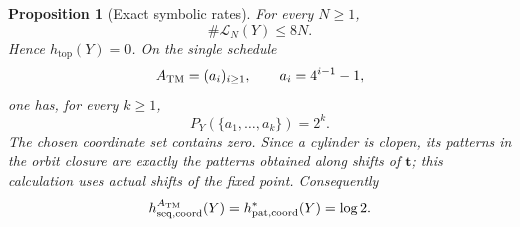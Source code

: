 \documentclass[11pt,reqno]{amsart}
\numberwithin{equation}{section}
\newtheorem{proposition}[theorem]{Proposition}
\theoremstyle{definition}
\theoremstyle{definition}
\newcommand{\Lcal}{\mathcal L}
\newcommand{\htop}{h_{\mathrm{top}}}
\begin{document}
\begin{proposition}[Exact symbolic rates]\label{prop:thue-morse}
For every $N\ge1$,
\begin{equation}\label{eq:TM-linear}
 \#\Lcal_N(Y)\le8N.
\end{equation}
Hence $\htop(Y)=0$.  On the single schedule
\begin{equation}\label{eq:TM-schedule}
 A_{\rm TM}=(a_i)_{i\ge1},
 \qquad a_i=4^{i-1}-1,
\end{equation}
one has, for every $k\ge1$,
\begin{equation}\label{eq:TM-full-pattern}
 P_Y(\{a_1,\ldots,a_k\})=2^k.
\end{equation}
The chosen coordinate set contains zero.  Since a cylinder is clopen, its
patterns in the orbit closure are exactly the patterns obtained along shifts
of $\mathbf t$; this calculation uses actual shifts of the fixed point.  Consequently
\begin{equation}\label{eq:TM-complexities}
 h_{\rm seq,coord}^{A_{\rm TM}}(Y)
 =h_{\rm pat,coord}^*(Y)=\log2.
\end{equation}
\end{proposition}
\end{document}
